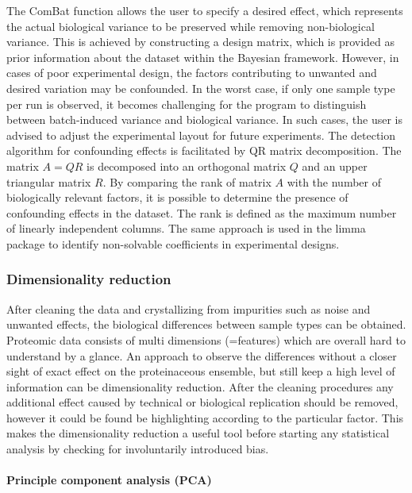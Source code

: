 \documentclass[
  11pt,
]{article}
\begin{document}
The ComBat function allows the user to specify a desired effect, which represents the actual biological variance to be preserved while removing non-biological variance. This is achieved by constructing a design matrix, which is provided as prior information about the dataset within the Bayesian framework. However, in cases of poor experimental design, the factors contributing to unwanted and desired variation may be confounded. In the worst case, if only one sample type per run is observed, it becomes challenging for the program to distinguish between batch-induced variance and biological variance. In such cases, the user is advised to adjust the experimental layout for future experiments.
The detection algorithm for confounding effects is facilitated by QR matrix decomposition. The matrix \(A=QR\) is decomposed into an orthogonal matrix \(Q\) and an upper triangular matrix \(R\).
By comparing the rank of matrix \(A\) with the number of biologically relevant factors, it is possible to determine the presence of confounding effects in the dataset. The rank is defined as the maximum number of linearly independent columns. The same approach is used in the limma package \citep{Phipson2016} to identify non-solvable coefficients in experimental designs.

\hypertarget{dimensionality-reduction}{%
\subsubsection{Dimensionality reduction}\label{dimensionality-reduction}}

After cleaning the data and crystallizing from impurities such as noise and unwanted effects, the biological differences between sample types can be obtained. Proteomic data consists of multi dimensions (=features) which are overall hard to understand by a glance. An approach to observe the differences without a closer sight of exact effect on the proteinaceous ensemble, but still keep a high level of information can be dimensionality reduction. After the cleaning procedures any additional effect caused by technical or biological replication should be removed, however it could be found be highlighting according to the particular factor. This makes the dimensionality reduction a useful tool before starting any statistical analysis by checking for involuntarily introduced bias.

\hypertarget{principle-component-analysis-pca}{%
\paragraph{Principle component analysis (PCA)}\label{principle-component-analysis-pca}}
\end{document}
